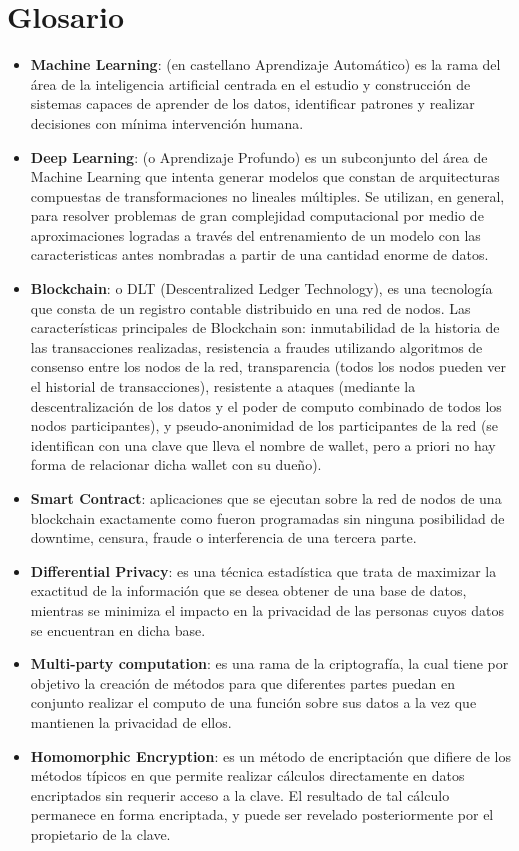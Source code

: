 \documentclass[
11pt, %
oneside, %
spanish, %
singlespacing, %
parskip, %
headsepline, %
chapterinoneline, %
]{MastersDoctoralThesis} %
\begin{document}
\chapter{Glosario}
\begin{itemize}
\item \textbf{Machine Learning}: (en castellano Aprendizaje Automático) es la rama del área de la inteligencia artificial centrada en el estudio y construcción de sistemas capaces de aprender de los datos, identificar patrones y realizar decisiones con mínima intervención humana. 
\item \textbf{Deep Learning}: (o Aprendizaje Profundo) es un subconjunto del área de Machine Learning que intenta generar modelos que constan de arquitecturas compuestas de transformaciones no lineales múltiples. Se utilizan, en general, para resolver problemas de gran complejidad computacional por medio de aproximaciones logradas a través del entrenamiento de un modelo con las caracteristicas antes nombradas a partir de una cantidad enorme de datos.
\item \textbf{Blockchain}: o DLT (Descentralized Ledger Technology), es una tecnología que consta de un registro contable distribuido en una red de nodos. Las características principales de Blockchain son: inmutabilidad de la historia de las transacciones realizadas, resistencia a fraudes utilizando algoritmos de consenso entre los nodos de la red, transparencia (todos los nodos pueden ver el historial de transacciones), resistente a ataques (mediante la descentralización de los datos y el poder de computo combinado de todos los nodos participantes), y pseudo-anonimidad de los participantes de la red (se identifican con una clave que lleva el nombre de wallet, pero a  priori no hay forma de relacionar dicha wallet con su dueño).
\item \textbf{Smart Contract}: aplicaciones que se ejecutan sobre la red de nodos de una blockchain exactamente como fueron programadas sin ninguna posibilidad de downtime, censura, fraude o interferencia de una tercera parte.
\item \textbf{Differential Privacy}: es una técnica estadística que trata de maximizar la exactitud de la información que se desea obtener de una base de datos, mientras se minimiza el impacto  en la privacidad de las personas cuyos datos se encuentran en dicha base.
\item \textbf{Multi-party computation}: es una rama de la criptografía, la cual tiene por objetivo la creación de métodos para que diferentes partes puedan en conjunto realizar el computo de una función sobre sus datos a la vez que mantienen la privacidad de ellos.
\item \textbf{Homomorphic Encryption}: es un método de encriptación que difiere de los métodos típicos en que permite realizar cálculos directamente en datos encriptados sin requerir acceso a la clave. El resultado de tal cálculo permanece en forma encriptada, y puede ser revelado posteriormente por el propietario de la clave.
\end{itemize}
\end{document}
